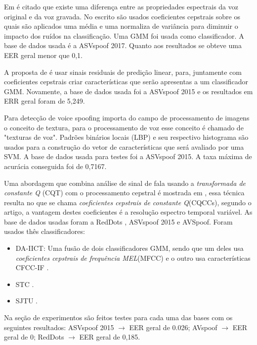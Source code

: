 \documentclass[a4paper,12pt,openright,oneside]{book}
\newenvironment{myenv}[1]
  {\begin{spacing}{#1}}
  {\end{spacing}}
\begin{document}
\begin{myenv}{1.5}
			\par Em \cite{8725688} é citado que existe uma diferença entre as propriedades espectrais da voz original e da voz gravada. No escrito são usados coeficientes cepstrais sobre os quais são aplicados uma média e uma normaliza de variância para diminuir o impacto dos ruídos na classificação. Uma GMM foi usada como classificador. A base de dados usada é a ASVspoof 2017. Quanto aos resultados se obteve uma EER geral menor que 0,1.
		
			\par A proposta de \cite{Hanilci2018} é usar sinais residuais de predição linear, para, juntamente com coeficientes cepstrais criar características que serão apresentas a um classificador GMM. Novamente, a base de dados usada foi a ASVspoof 2015 e os resultados em ERR geral foram de 5,249.

			\par Para detecção de voice spoofing  \cite{ISI:000473343500086} importa do campo de processamento de imagens o conceito de textura, para o processamento de voz esse conceito é chamado de "texturas de voz". Padrões binários locais (LBP) e seu respectivo histograma são usados para a construção do vetor de características que será avaliado por uma SVM. A base de dados usada para testes foi a ASVspoof 2015. A taxa máxima de acurácia conseguida foi de 0,7167.
			
			\par Uma abordagem que combina análise de sinal de fala usando a \textit{transformada de constante Q} (CQT) com o processamento cepstral é mostrada em \cite{TODISCO2017516}, essa técnica resulta no que se chama \textit{coeficientes cepstrais de constante Q}(CQCCs), segundo o artigo, a vantagem destes coeficientes é a resolução espectro temporal variável. As base de dados usadas foram a RedDots \cite{redDots}, ASVspoof 2015 e AVSpoof. Foram usados thês classificadores:
			\begin{itemize}
				\item DA-IICT: Uma fusão de dois classificadores GMM, sendo que um deles usa \textit{coeficientes cepstrais de frequência MEL}(MFCC) e o outro usa características CFCC-IF \cite{Patel2015}.
				\item STC \cite{7472724}.
				\item SJTU \cite{korshunov2016overview}.
			\end{itemize}			
			Na seção de experimentos são feitos testes para cada uma das bases com os seguintes resultados: ASVspoof 2015 $\rightarrow$ EER geral de 0.026; AVspoof $\rightarrow$ EER geral de 0; RedDots $\rightarrow$ EER geral de 0,185.


\end{myenv}
\end{document}
